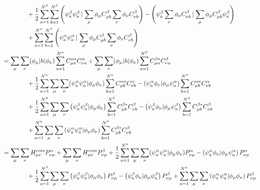 \documentclass[a4paper]{book}
\newcounter{solution}[chapter]
\newcommand{\core}{{\rm core}}
\begin{document}
\begin{solution}
\begin{align*}
		&\hspace{4em} + \frac{1}{2} \sum_{ a=1 }^{ N^\beta } \sum_{ b=1 }^{ N^\beta } \left( \psi^\beta_a \psi^\beta_a \left| \right. \sum_\mu \phi_\mu C^\beta_{\mu b} \sum_\nu \phi_\nu C^\beta_{\nu b} \right) - \left( \psi^\beta_a \sum_\nu \phi_\nu C^\beta_{\nu b} \left| \right. \sum_\mu \phi_\mu C^\beta_{\mu b} \psi^\beta_a \right) \\
		&\hspace{4em} + \sum_{ a=1 }^{ N^\alpha } \sum_{ b=1 }^{ N^\beta } \left( \psi^\alpha_a \psi^\alpha_a \left| \right. \sum_\mu \phi_\mu C^\beta_{\mu b} \sum_\nu \phi_\nu C^\beta_{\nu b} \right) \\
		&= \sum_\mu \sum_\nu ( \phi_\mu | h | \phi_\nu ) \sum_{ a=1 }^{ N^\alpha } C^{\alpha*}_{\mu a} C^\alpha_{\nu a} + \sum_\mu \sum_\nu ( \phi_\mu | h | \phi_\nu ) \sum_{ a=1 }^{ N^\beta } C^{\beta*}_{\mu a} C^\beta_{\nu a} \\
		&\hspace{4em} + \frac{1}{2} \sum_{ a=1 }^{ N^\alpha }\sum_\mu \sum_\nu ( \psi^\alpha_a \psi^\alpha_a | \phi_\mu \phi_\nu ) \sum_{ b=1 }^{ N^\alpha } C^{\alpha*}_{\mu b} C^\alpha_{\nu b} - \left( \psi^\alpha_a \phi_\nu | \phi_\mu \psi^\alpha_a \right) \sum_{ b=1 }^{ N^\alpha } C^{\alpha*}_{\mu b} C^\alpha_{\nu b} \\
		&\hspace{4em} + \frac{1}{2} \sum_{ a=1 }^{ N^\beta }\sum_\mu \sum_\nu \left( \psi^\beta_a \psi^\beta_a | \phi_\mu \phi_\nu \right) \sum_{ b=1 }^{ N^\beta } C^{\beta*}_{\mu b} C^\beta_{\nu b} - \left( \psi^\beta_a \phi_\nu | \phi_\mu \psi^\beta_a \right)\sum_{ b=1 }^{ N^\beta } C^{\beta*}_{\mu b} C^\beta_{\nu b}  \\
		&\hspace{4em} + \sum_{ a=1 }^{ N^\alpha } \sum_\mu \sum_\nu \left( \psi^\alpha_a \psi^\alpha_a | \phi_\mu \phi_\nu \right) \sum_{ b=1 }^{ N^\beta } C^{\beta*}_{\mu b} C^\beta_{\nu b} \\
		&= \sum_\mu \sum_\nu H^\core_{\mu \nu} P^\alpha_{\nu \mu} + \sum_\mu \sum_\nu H^\core_{\mu \nu} P^\beta_{\nu \mu} + \frac{1}{2} \sum_{ a=1 }^{ N^\alpha }\sum_\mu \sum_\nu ( \psi^\alpha_a \psi^\alpha_a | \phi_\mu \phi_\nu ) P^\alpha_{\nu \mu} - \left( \psi^\alpha_a \phi_\nu | \phi_\mu \psi^\alpha_a \right) P^\alpha_{\nu \mu} \\
		&\hspace{4em} + \frac{1}{2} \sum_{ a=1 }^{ N^\beta }\sum_\mu \sum_\nu \left( \psi^\beta_a \psi^\beta_a | \phi_\mu \phi_\nu \right) P^\beta_{\nu \mu} - \left( \psi^\beta_a \phi_\nu | \phi_\mu \psi^\beta_a \right) P^\beta_{\nu \mu} +  \sum_{ a=1 }^{ N^\alpha } \sum_\mu \sum_\nu \left( \psi^\alpha_a \psi^\alpha_a | \phi_\mu \phi_\nu \right) P^\beta_{\nu \mu} \\

\end{align*}
\end{solution}
\end{document}
